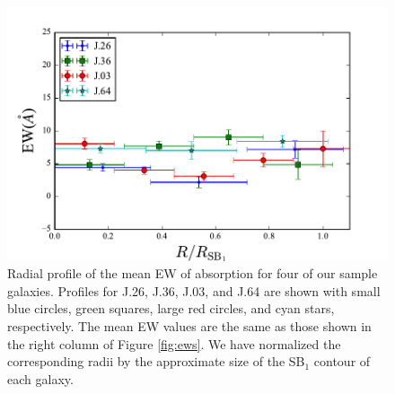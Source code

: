 \documentclass[twocolumn]{aastex62}
\begin{document}

\begin{figure}[!htb]
\centering
\includegraphics[scale=0.7]{figure10.pdf}%
\caption{Radial profile of the mean EW of  absorption for four of our sample galaxies. Profiles for J.26,  J.36,  J.03, and J.64 are shown with small blue circles, green squares, large red circles, and cyan stars, respectively. The mean EW values are the same as those shown in the right column of Figure \ref{fig:ews}. We have normalized the corresponding radii by the approximate size of the SB$_1$ contour of each galaxy.}
\label{fig:ew_comb}
\end{figure}
\end{document}
